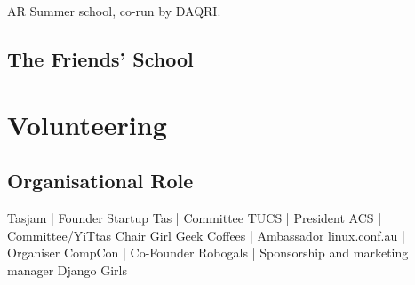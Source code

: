 \documentclass[a4paper]{deedy-resume} %
\begin{document}
\begin{minipage}[t]{0.33\textwidth}
AR Summer school, co-run by DAQRI. \\

\sectionspace %


\subsection{The Friends' School}


\sectionspace %


\section{Volunteering}

\subsection{Organisational Role}
Tasjam | Founder \textbullet{} Startup Tas | Committee \textbullet{} TUCS | President \textbullet{}
ACS | Committee/YiTtas Chair \textbullet{} Girl Geek Coffees | Ambassador \textbullet{}
linux.conf.au | Organiser \textbullet{} CompCon | Co-Founder \textbullet{}
Robogals | Sponsorship and marketing manager \textbullet{} Django Girls \\



\end{minipage}
\end{document}
